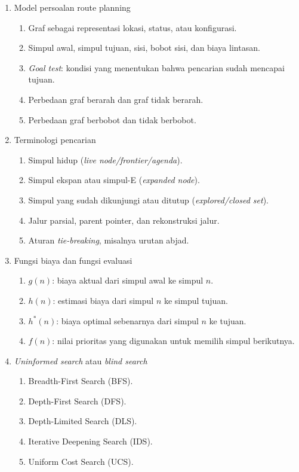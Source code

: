 \begin{enumerate}
    \item Model persoalan route planning
    \begin{enumerate}
        \item Graf sebagai representasi lokasi, status, atau konfigurasi.
        \item Simpul awal, simpul tujuan, sisi, bobot sisi, dan biaya lintasan.
        \item \textit{Goal test}: kondisi yang menentukan bahwa pencarian sudah mencapai tujuan.
        \item Perbedaan graf berarah dan graf tidak berarah.
        \item Perbedaan graf berbobot dan tidak berbobot.
    \end{enumerate}

    \item Terminologi pencarian
    \begin{enumerate}
        \item Simpul hidup (\textit{live node/frontier/agenda}).
        \item Simpul ekspan atau simpul-E (\textit{expanded node}).
        \item Simpul yang sudah dikunjungi atau ditutup (\textit{explored/closed set}).
        \item Jalur parsial, parent pointer, dan rekonstruksi jalur.
        \item Aturan \textit{tie-breaking}, misalnya urutan abjad.
    \end{enumerate}

    \item Fungsi biaya dan fungsi evaluasi
    \begin{enumerate}
        \item $g(n)$: biaya aktual dari simpul awal ke simpul $n$.
        \item $h(n)$: estimasi biaya dari simpul $n$ ke simpul tujuan.
        \item $h^*(n)$: biaya optimal sebenarnya dari simpul $n$ ke tujuan.
        \item $f(n)$: nilai prioritas yang digunakan untuk memilih simpul berikutnya.
    \end{enumerate}

    \item \textit{Uninformed search} atau \textit{blind search}
    \begin{enumerate}
        \item Breadth-First Search (BFS).
        \item Depth-First Search (DFS).
        \item Depth-Limited Search (DLS).
        \item Iterative Deepening Search (IDS).
        \item Uniform Cost Search (UCS).
    \end{enumerate}


\end{enumerate}
